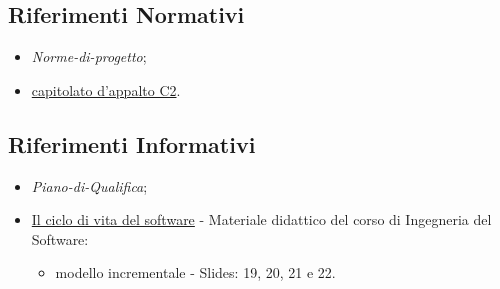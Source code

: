 \subsection{Riferimenti Normativi}
\begin{itemize}
    \item \textit{Norme-di-progetto};
    \item \href{https://www.math.unipd.it/~tullio/IS-1/2022/Progetto/C2.pdf}{capitolato d'appalto C2}.
\end{itemize}

\subsection{Riferimenti Informativi}
\begin{itemize}
    \item \textit{Piano-di-Qualifica};
    \item \href{https://www.math.unipd.it/~tullio/IS-1/2022/Dispense/T03.pdf}{Il ciclo di vita del software} - Materiale didattico del corso di Ingegneria del Software:
    \begin{itemize}
        \item modello incrementale - Slides: 19, 20, 21 e 22.
    \end{itemize}
\end{itemize}
